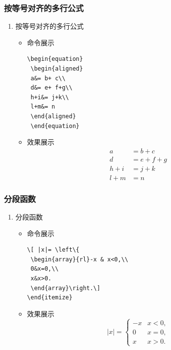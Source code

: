 \documentclass[UTF8]{ctexart}
\begin{document}
\subsubsection{按等号对齐的多行公式}
\begin{enumerate}
  \item 按等号对齐的多行公式
   \begin{itemize}
      \item 命令展示
\begin{lstlisting}
\begin{equation}
 \begin{aligned}
 a&= b+ c\\
 d&= e+ f+g\\
 h+i&= j+k\\
 l+m&= n
 \end{aligned}
 \end{equation}
\end{lstlisting}
\item 效果展示
\begin{equation}
 \begin{aligned}
 a&= b+ c\\
 d&= e+ f+g\\
 h+i&= j+k\\
 l+m&= n
 \end{aligned}
 \end{equation}
\end{itemize}
\end{enumerate}
\subsubsection{分段函数}
\begin{enumerate}
  \item 分段函数
   \begin{itemize}
      \item 命令展示
\begin{lstlisting}
\[ |x|= \left\{
 \begin{array}{rl}-x & x<0,\\
 0&x=0,\\
 x&x>0.
 \end{array}\right.\]
\end{itemize}
\end{lstlisting}
\item 效果展示
\[ |x|= \left\{
 \begin{array}{rl}-x & x<0,\\
 0&x=0,\\
 x&x>0.
 \end{array}\right.\]
\end{itemize}
\end{enumerate}
\end{document}
